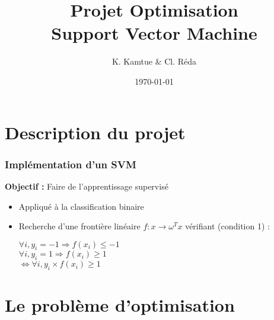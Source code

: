 \documentclass{beamer}
\title{Projet Optimisation\\Support Vector Machine}
\author{K. Kamtue \& Cl. Réda}
\institute{ENS Cachan}
\date{\today}
\begin{document}
\maketitle
\tableofcontents
\setlength{\parindent}{1cm}


\section{Description du projet}

\begin{frame}
\frametitle{Implémentation d'un SVM}

\begin{center}
\textbf{Objectif :} Faire de l'apprentissage supervisé
\end{center}

\begin{itemize}
\item Appliqué à la classification binaire

         \begin{center}
         \end{center}

\item Recherche d'une frontière linéaire $f : x \rightarrow \omega^Tx$ vérifiant (condition 1) :

         \begin{center}
         $\forall i, y_i = -1 \Rightarrow f(x_i) \leq -1$\\
         $\forall i, y_i = 1 \Rightarrow f(x_i) \geq 1$\\
         $\Leftrightarrow \forall i, y_i \times f(x_i) \geq 1$
         \end{center}
\end{itemize}

\end{frame}

\section{Le problème d'optimisation}
\end{document}
